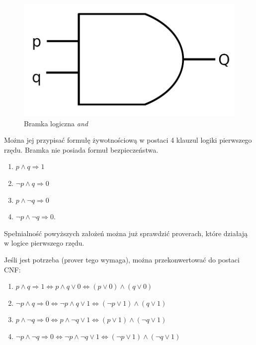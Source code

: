 \documentclass[a4paper,12pt]{article}
\begin{document}
\begin{figure}[H]
  \centering
  \includegraphics[scale=0.5]{images/AND.png}
  \caption{Bramka logiczna \textit{and}}
\end{figure}

Można jej przypisać formułę żywotnościową w postaci 4 klauzul logiki pierwszego rzędu. Bramka nie posiada formuł bezpieczeństwa.

\begin{enumerate}
  \item $p \land q \Rightarrow 1$
  \item $\lnot p \land q \Rightarrow 0$
  \item $p \land \lnot q \Rightarrow 0$
  \item $\lnot p \land \lnot q \Rightarrow 0$.
\end{enumerate}

\noindent
Spełnialność powyższych założeń można już sprawdzić proverach, które działają w logice pierwszego rzędu.

Jeśli jest potrzeba (\gls{prover} tego wymaga), można przekonwertować do postaci \gls{CNF}:

\begin{enumerate}
  \item $p \land q \Rightarrow 1 \Leftrightarrow p \land q \lor 0 \Leftrightarrow (p \lor 0) \land (q \lor 0)$
  \item $\lnot p \land q \Rightarrow 0 \Leftrightarrow \lnot p \land q \lor 1 \Leftrightarrow (\lnot p \lor 1) \land (q \lor 1) $
  \item $p \land \lnot q \Rightarrow 0 \Leftrightarrow p \land \lnot q \lor 1 \Leftrightarrow (p \lor 1) \land (\lnot q \lor 1)$
  \item $\lnot p \land \lnot q \Rightarrow 0 \Leftrightarrow \lnot p \land \lnot q \lor 1 \Leftrightarrow (\lnot p \lor 1) \land (\lnot q \lor 1)$
\end{enumerate}
\end{document}
